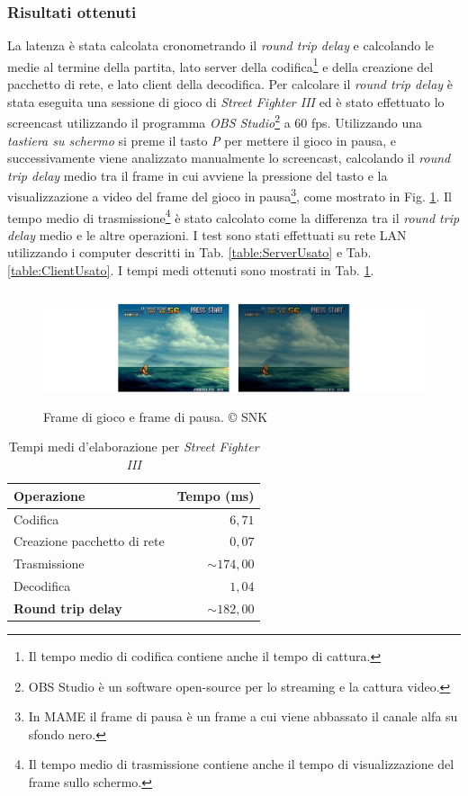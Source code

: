 \subsubsection{Risultati ottenuti}
La latenza è stata calcolata cronometrando il \textit{round trip delay} e calcolando le medie al termine della partita, lato server della codifica\footnote{Il tempo medio di codifica contiene anche il tempo di cattura.} e della creazione del pacchetto di rete, e lato client della decodifica. Per calcolare il \textit{round trip delay} è stata eseguita una sessione di gioco di \textit{Street Fighter III} ed è stato effettuato lo screencast utilizzando il programma \textit{OBS Studio}\footnote{OBS Studio è un software open-source per lo streaming e la cattura video.} a 60 fps. Utilizzando una \textit{tastiera su schermo} si preme il tasto \textit{P} per mettere il gioco in pausa, e successivamente viene analizzato manualmente lo screencast, calcolando il \textit{round trip delay} medio tra il frame in cui avviene la pressione del tasto e la visualizzazione a video del frame del gioco in pausa\footnote{In MAME il frame di pausa è un frame a cui viene abbassato il canale alfa su sfondo nero.}, come mostrato in Fig. \ref{fig:pause}. Il tempo medio di trasmissione\footnote{Il tempo medio di trasmissione contiene anche il tempo di visualizzazione del frame sullo schermo.} è stato calcolato come la differenza tra il \textit{round trip delay} medio e le altre operazioni. I test sono stati effettuati su rete LAN utilizzando i computer descritti in Tab. \ref{table:ServerUsato} e Tab. \ref{table:ClientUsato}. I tempi medi ottenuti sono mostrati in Tab. \ref{table:LatenzaOttenuta}.

\begin{figure}[H]
	\centering
	\includegraphics[height=3.3cm]{immagini/pause}
	\caption{Frame di gioco e frame di pausa. © SNK}	
	\label{fig:pause}
\end{figure}

\begin{table}[H]
	\centering
	\begin{tabular}{||l r||}
		\hline
		Operazione & Tempo (ms) \\
		\hline\hline				
		\hline
		Codifica & $6,71$ \\
		\hline
		Creazione pacchetto di rete & $0,07$ \\
		\hline
		Trasmissione & $\sim 174,00$ \\
		\hline
		Decodifica & $1,04$ \\
		\hline\hline
		\textbf{Round trip delay} & \textbf{$\sim 182,00$} \\
		\hline
	\end{tabular}

	\caption{Tempi medi d'elaborazione per \textit{Street Fighter III}}
	\label{table:LatenzaOttenuta}
\end{table}

